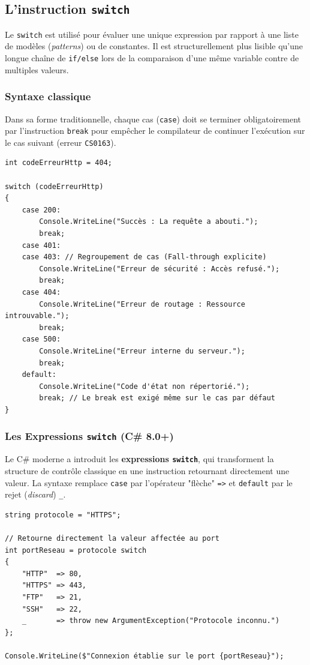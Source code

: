 \subsection{L'instruction \texttt{switch}}

Le \texttt{switch} est utilisé pour évaluer une unique expression par rapport à une liste de modèles (\emph{patterns}) ou de constantes. Il est structurellement plus lisible qu'une longue chaîne de \texttt{if/else} lors de la comparaison d'une même variable contre de multiples valeurs.

\subsubsection{Syntaxe classique}

Dans sa forme traditionnelle, chaque cas (\texttt{case}) doit se terminer obligatoirement par l'instruction \texttt{break} pour empêcher le compilateur de continuer l'exécution sur le cas suivant (erreur \texttt{CS0163}).

\begin{lstlisting}[caption={Routage par instruction switch}]
int codeErreurHttp = 404;

switch (codeErreurHttp)
{
    case 200:
        Console.WriteLine("Succès : La requête a abouti.");
        break;
    case 401:
    case 403: // Regroupement de cas (Fall-through explicite)
        Console.WriteLine("Erreur de sécurité : Accès refusé.");
        break;
    case 404:
        Console.WriteLine("Erreur de routage : Ressource introuvable.");
        break;
    case 500:
        Console.WriteLine("Erreur interne du serveur.");
        break;
    default:
        Console.WriteLine("Code d'état non répertorié.");
        break; // Le break est exigé même sur le cas par défaut
}
\end{lstlisting}

\subsubsection{Les Expressions \texttt{switch} (C\# 8.0+)}

Le C\# moderne a introduit les \textbf{expressions \texttt{switch}}, qui transforment la structure de contrôle classique en une instruction retournant directement une valeur. La syntaxe remplace \texttt{case} par l'opérateur "flèche" \texttt{=>} et \texttt{default} par le rejet (\emph{discard}) \texttt{\_}.

\begin{lstlisting}[caption={Affectation via expression switch moderne}]
string protocole = "HTTPS";

// Retourne directement la valeur affectée au port
int portReseau = protocole switch
{
    "HTTP"  => 80,
    "HTTPS" => 443,
    "FTP"   => 21,
    "SSH"   => 22,
    _       => throw new ArgumentException("Protocole inconnu.")
};

Console.WriteLine($"Connexion établie sur le port {portReseau}");
\end{lstlisting}

